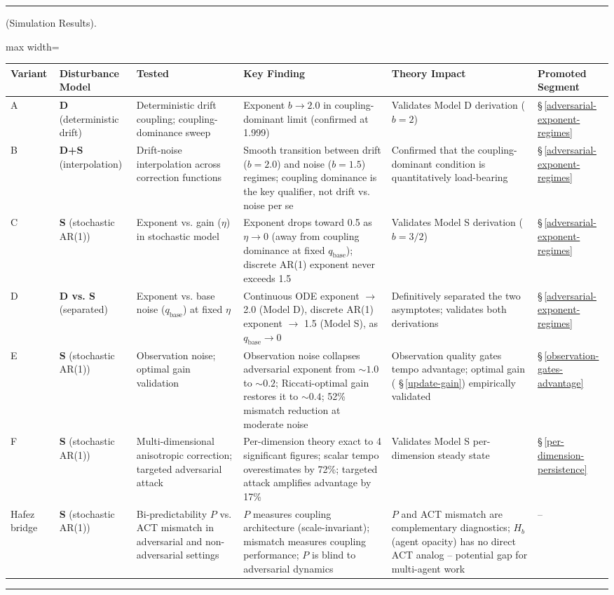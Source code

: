 \documentclass[11pt,oneside]{article}
\newcounter{claim}[section]
\renewcommand{\theclaim}{\thesection.\arabic{claim}}
\newenvironment{segment}[2]{%
  \refstepcounter{claim}%
  \bigskip\noindent\hrule\smallskip
  \noindent{\bfseries #1~\theclaim}\enskip(#2).\par\smallskip
  \noindent\ignorespaces
}{%
  \par\smallskip\noindent\hrule\bigskip
}
\newenvironment{detail}[1][]{\begin{segment}{Detail}{#1}}{\end{segment}}
\begin{document}
\begin{detail}[Simulation Results]
\begin{adjustbox}{max width=\textwidth}
\small
\begin{tabular}{llllll}
\toprule
Variant & Disturbance Model & Tested & Key Finding & Theory Impact & Promoted Segment \\
\midrule
A & \textbf{D} (deterministic drift) & Deterministic drift coupling; coupling-dominance sweep & Exponent $b \to 2.0$ in coupling-dominant limit (confirmed at 1.999) & Validates Model D derivation ($b = 2$) & \S\,\ref{adversarial-exponent-regimes} \\
B & \textbf{D+S} (interpolation) & Drift-noise interpolation across correction functions & Smooth transition between drift ($b = 2.0$) and noise ($b = 1.5$) regimes; coupling dominance is the key qualifier, not drift vs. noise per se & Confirmed that the coupling-dominant condition is quantitatively load-bearing & \S\,\ref{adversarial-exponent-regimes} \\
C & \textbf{S} (stochastic AR(1)) & Exponent vs. gain ($\eta$) in stochastic model & Exponent drops toward 0.5 as $\eta \to 0$ (away from coupling dominance at fixed $q_\text{base}$); discrete AR(1) exponent never exceeds 1.5 & Validates Model S derivation ($b = 3/2$) & \S\,\ref{adversarial-exponent-regimes} \\
D & \textbf{D vs. S} (separated) & Exponent vs. base noise ($q_\text{base}$) at fixed $\eta$ & Continuous ODE exponent $\to$ 2.0 (Model D), discrete AR(1) exponent $\to$ 1.5 (Model S), as $q_\text{base} \to 0$ & Definitively separated the two asymptotes; validates both derivations & \S\,\ref{adversarial-exponent-regimes} \\
E & \textbf{S} (stochastic AR(1)) & Observation noise; optimal gain validation & Observation noise collapses adversarial exponent from $\sim 1.0$ to $\sim 0.2$; Riccati-optimal gain restores it to $\sim 0.4$; 52\% mismatch reduction at moderate noise & Observation quality gates tempo advantage; optimal gain ( \S\,\ref{update-gain}) empirically validated & \S\,\ref{observation-gates-advantage} \\
F & \textbf{S} (stochastic AR(1)) & Multi-dimensional anisotropic correction; targeted adversarial attack & Per-dimension theory exact to 4 significant figures; scalar tempo overestimates by 72\%; targeted attack amplifies advantage by 17\% & Validates Model S per-dimension steady state & \S\,\ref{per-dimension-persistence} \\
Hafez bridge & \textbf{S} (stochastic AR(1)) & Bi-predictability $P$ vs. ACT mismatch in adversarial and non-adversarial settings & $P$ measures coupling architecture (scale-invariant); mismatch measures coupling performance; $P$ is blind to adversarial dynamics & $P$ and ACT mismatch are complementary diagnostics; $H_b$ (agent opacity) has no direct ACT analog -- potential gap for multi-agent work & -- \\
\bottomrule
\end{tabular}
\end{adjustbox}




\end{detail}
\end{document}
